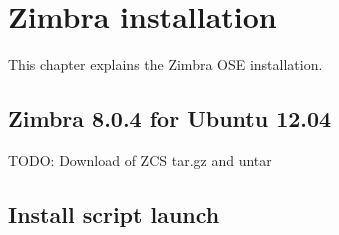 

\chapter{Zimbra installation}
This chapter explains the Zimbra OSE installation.

\section {Zimbra 8.0.4 for Ubuntu 12.04}
TODO: Download of ZCS tar.gz and untar

\section {Install script launch}


